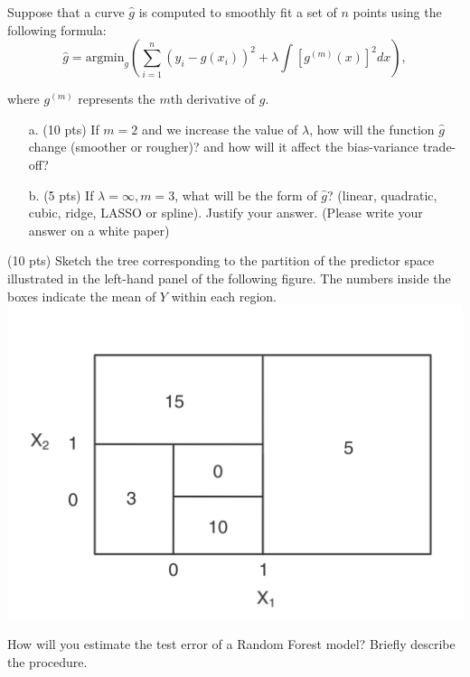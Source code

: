 \documentclass[11pt,letter]{exam}
\begin{document}
\begin{questions}
\newpage

\item Suppose that a curve $\hat{g}$ is computed to smoothly fit a set of $n$ points
using the following formula:
\[
	\hat{g} = \text{argmin}_g \left( \sum_{i= 1}^n (y_i - g(x_i))^2 + \lambda \int [g^{(m)}(x) ]^2 dx  \right), 
\]

where $g^{(m)}$ represents the $m$th derivative of $g$.
\begin{itemize}
	\item[a.] (10 pts) If $m = 2$ and we increase the value of $\lambda$, how will the function $\hat{g}$ change (smoother or  rougher)?  and how will it affect the bias-variance trade-off?
	\item[b.] (5 pts)  If $\lambda = \infty, m = 3$, what will be the form of $\hat{g}$? (linear, quadratic, cubic, ridge, LASSO or spline). Justify your answer. 
(Please write your answer on a white paper)
\end{itemize}

\newpage
\item (10 pts) Sketch the tree corresponding to the partition of the predictor space illustrated in the left-hand panel of the following figure. The numbers inside the boxes indicate the mean of $Y$ within each region.\\
\includegraphics[scale=1]{fig1.png}
\vspace{2 in}

\question[10] How will you estimate the test error of a Random Forest model? Briefly describe the procedure. 
\newpage



\end{questions}
\end{document}
